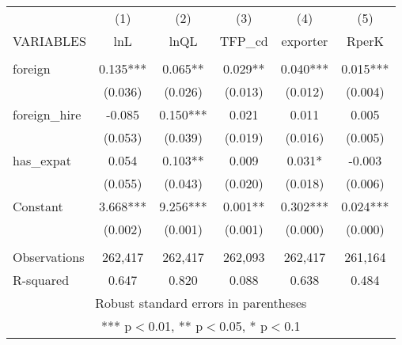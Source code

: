 \begin{tabular}{lccccc} \hline
 & (1) & (2) & (3) & (4) & (5) \\
VARIABLES & lnL & lnQL & TFP\_cd & exporter & RperK \\ \hline
 &  &  &  &  &  \\
foreign & 0.135*** & 0.065** & 0.029** & 0.040*** & 0.015*** \\
 & (0.036) & (0.026) & (0.013) & (0.012) & (0.004) \\
foreign\_hire & -0.085 & 0.150*** & 0.021 & 0.011 & 0.005 \\
 & (0.053) & (0.039) & (0.019) & (0.016) & (0.005) \\
has\_expat & 0.054 & 0.103** & 0.009 & 0.031* & -0.003 \\
 & (0.055) & (0.043) & (0.020) & (0.018) & (0.006) \\
Constant & 3.668*** & 9.256*** & 0.001** & 0.302*** & 0.024*** \\
 & (0.002) & (0.001) & (0.001) & (0.000) & (0.000) \\
 &  &  &  &  &  \\
Observations & 262,417 & 262,417 & 262,093 & 262,417 & 261,164 \\
 R-squared & 0.647 & 0.820 & 0.088 & 0.638 & 0.484 \\ \hline
\multicolumn{6}{c}{ Robust standard errors in parentheses} \\
\multicolumn{6}{c}{ *** p$<$0.01, ** p$<$0.05, * p$<$0.1} \\
\end{tabular}
